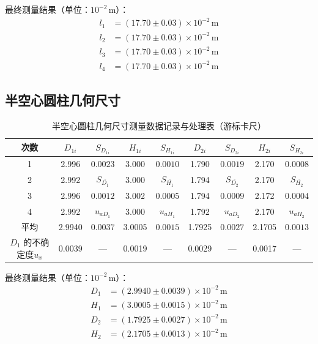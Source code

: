 \documentclass[12pt,a4paper]{article}
\begin{document}
	\par 最终测量结果（单位：$10^{-2}\,\text{m}$）：
	\begin{align*}
		l_1 &= (17.70 \pm 0.03) \times 10^{-2}\,\text{m} \\
		l_2 &= (17.70 \pm 0.03) \times 10^{-2}\,\text{m} \\
		l_3 &= (17.70 \pm 0.03) \times 10^{-2}\,\text{m} \\
		l_4 &= (17.70 \pm 0.03) \times 10^{-2}\,\text{m}
	\end{align*}
	
	
	
	\subsection*{半空心圆柱几何尺寸}
	\begin{table}[H]
		\centering
		\caption{半空心圆柱几何尺寸测量数据记录与处理表（游标卡尺）}
		\label{tab:cylinder_comprehensive}
		\footnotesize
		\begin{tabular}{|c|c|c|c|c|c|c|c|c|}
			\hline
			次数 & $D_{1i}$ & $S_{D_{1i}}$ & $H_{1i}$ & $S_{H_{1i}}$ & $D_{2i}$ & $S_{D_{2i}}$ & $H_{2i}$ & $S_{H_{2i}}$ \\
			\hline
			1 & 2.996 & $0.0023$ & 3.000 & $0.0010$ & 1.790 & $0.0019$ & 2.170 & $0.0008$  \\
			\hline
			2 & 2.992 & $S_{\overline{D_1}}$ & 3.000 & $S_{\overline{H_1}}$ & 1.794 & $S_{\overline{D_2}}$ & 2.170 & $S_{\overline{H_2}}$  \\
			\hline
			3 & 2.996 & $0.0012$ & 3.002 & $0.0005$ & 1.794 & $0.0009$ & 2.172 & $0.0004$  \\
			\hline
			4 & 2.992 & $u_{aD_1}$ & 3.000 & $u_{aH_1}$ & 1.792 & $u_{aD_2}$ & 2.170 & $u_{aH_2}$  \\
			\hline
			平均 & 2.9940 & $0.0037$ & 3.0005 & $0.0015$ & 1.7925 & $0.0027 $ & 2.1705 & $0.0013$ \\
			\hline
			$D_1$ 的不确定度$u_x$ & 0.0039 & — & 0.0019 & — & 0.0029 & — & 0.0017 & — \\
			\hline
		\end{tabular}
	\end{table}
	\par 最终测量结果（单位：$10^{-2}\,\text{m}$）：
	\begin{align*}
		D_1 &= (2.9940 \pm 0.0039) \times 10^{-2}\,\text{m} \\
		H_1 &= (3.0005 \pm 0.0015) \times 10^{-2}\,\text{m} \\
		D_2 &= (1.7925 \pm 0.0027) \times 10^{-2}\,\text{m} \\
		H_2 &= (2.1705 \pm 0.0013) \times 10^{-2}\,\text{m}
	\end{align*}
	
\end{document}
